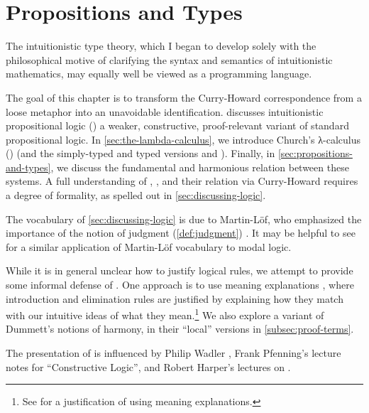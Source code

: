 \documentclass[./thesis.tex]{subfiles}
\begin{document}
\chapter{Propositions and Types}
\label{chap:propositions-and-types}


\epigraph{The intuitionistic type theory, which I began to develop solely with the philosophical motive of clarifying the syntax and semantics of intuitionistic mathematics, may equally well be viewed as a programming language.}{\cite{martin-lof-constructive}}

The goal of this chapter is to transform the Curry-Howard correspondence from
a loose metaphor into an unavoidable identification.  discusses
intuitionistic propositional logic (\IPL{}) a weaker, constructive,
proof-relevant variant of standard propositional logic. In
\cref{sec:the-lambda-calculus}, we introduce Church's λ-calculus (\LC{})
(and the simply-typed and typed versions \STLC{} and \TLC{}). Finally, in
\cref{sec:propositions-and-types}, we discuss the fundamental and
harmonious relation between these systems. A full understanding of \LC{},
\IPL{}, and their relation via Curry-Howard requires a degree of formality, as
spelled out in \cref{sec:discussing-logic}.

The vocabulary of \cref{sec:discussing-logic} is due to Martin-Löf, who
emphasized the importance of the notion of judgment (\cref{def:judgment})
\cite{martin-lof-meanings}. It may be helpful to see \cite{modal-judgment} for a
similar application of Martin-L\"of vocabulary to modal logic.

While it is in general unclear how to justify logical rules, we attempt to
provide some informal defense of \IPL{}. One approach is to use 
meaning explanations \cite{martin-lof-constructive}, where
introduction and elimination rules are justified by explaining how they match
with our intuitive ideas of what they mean.\footnote{See \cite{hott-meaning} for a
  justification of \HoTT{} using meaning explanations.}
We also explore a variant of Dummett's notions of harmony, in their ``local''
versions in \cref{subsec:proof-terms}. 

The presentation of  is influenced by
Philip Wadler \cite{wadler-propositions}, Frank Pfenning's lecture notes for
``Constructive Logic'', and Robert Harper's lectures on \HoTT \cite{harper}.
\end{document}
